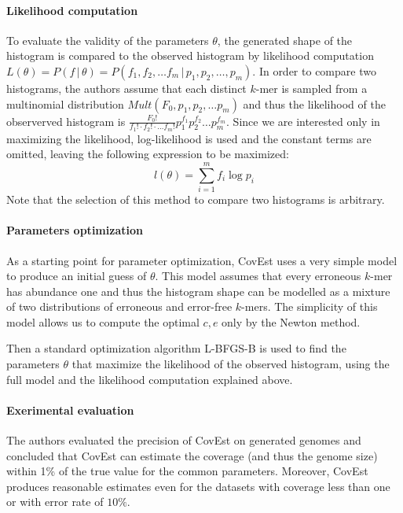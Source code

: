\paragraph{Likelihood computation}
To evaluate the validity of the parameters $\theta$, the generated shape of the histogram is
compared to the observed histogram by likelihood computation
$L(\theta) = P(f\,|\,\theta) = P(f_1, f_2, \dots f_m\,|\,p_1, p_2, \dots, p_m)$. In order to
compare two histograms, the authors assume that each distinct $k$-mer is sampled
from a multinomial distribution $Mult(F_0, p_1, p_2, \dots p_m)$ and thus the
likelihood of the observerved histogram is 
$\frac{F_0!}{f_1! \cdot f_2! \cdot \dots f_m!} p_1^{f_1} p_2^{f_2} \dots p_m ^{f_m}$.
Since we are interested only in maximizing the likelihood, log-likelihood is used and
the constant terms are omitted, leaving the following expression to be maximized:
$$l(\theta) = \sum_{i=1}^m f_i \log p_i$$
Note that the selection of this method to compare two histograms is arbitrary.

\paragraph{Parameters optimization}
As a starting point for parameter optimization, CovEst uses a very simple model
to produce an initial guess of $\theta$. This model assumes that every
erroneous $k$-mer has abundance one and thus the histogram shape can be modelled
as a mixture of two distributions of erroneous and error-free $k$-mers. The
simplicity of this model allows us to compute the optimal $c, e$ only by the Newton method.

Then a standard optimization algorithm L-BFGS-B is used to find the parameters $\theta$
that maximize the likelihood of the observed histogram, using the full model and the
likelihood computation explained above.

\paragraph{Exerimental evaluation}
The authors evaluated the precision of CovEst on generated genomes \cite{Hozza2015}
and concluded that CovEst can estimate the coverage (and thus the genome size) within 1\% 
of the true value for the common parameters. Moreover, CovEst produces reasonable
estimates even for the datasets with coverage less than one or with error rate of $10\%$.
